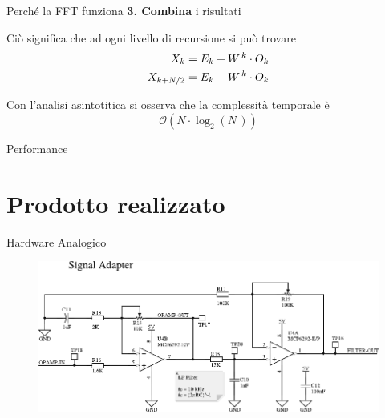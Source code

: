 \documentclass[10pt, xetex]{beamer}
\begin{document}
\begin{frame}{Perch\'e la FFT funziona}
    \textbf{\LARGE 3. Combina}
    {\color{gray} i risultati}
    \vfill

    Ci\`o significa che ad ogni livello di recursione si pu\`o trovare
    \begin{align*} \large
        X_k &= E_k + W^{\,k}\cdot O_k \\
        X_{k+N/2} &= E_k - W^{\,k}\cdot O_k
    \end{align*}

    Con l'analisi asintotitica si osserva che la complessit\`a temporale \`e
    {\large \[\mathcal{O}(N\cdot\log_2(N\,))\]}
\end{frame}

\begin{frame}{Performance}
    \begin{figure}
    \end{figure}
\end{frame}

\section{Prodotto realizzato}
\begin{frame}{Hardware Analogico}
    \begin{figure}
        \includegraphics[width=\linewidth]{figures/circuits/filter-ampl-v2}
    \end{figure}
\end{frame}
\end{document}
